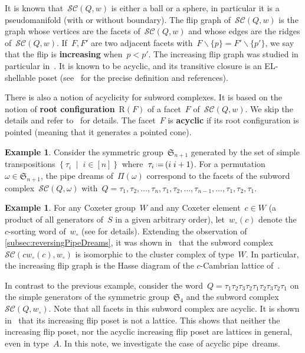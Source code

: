 \documentclass{amsart}
\theoremstyle{definition}
\newtheorem{example}[theorem]{Example}
\newcommand{\set}[2]{\left\{ #1 \;\middle|\; #2 \right\}} %
\newcommand{\ssm}{\smallsetminus} %
\newcommand{\eqdef}{\mbox{\,\raisebox{0.2ex}{\scriptsize\ensuremath{\mathrm:}}\ensuremath{=}\,}} %
\newcommand{\defn}[1]{\textbf{\textsf{\color{PineGreen} #1}}} %
\newcommand{\fS}{\mathfrak{S}} %
\newcommand{\pipeDreams}{\Pi} %
\newcommand{\wo}{w_\circ} %
\newcommand{\subwordComplex}{\mathcal{SC}} %
\newcommand{\Roots}{\mathrm{R}} %
\begin{document}
It is known that~$\subwordComplex(Q,w)$ is either a ball or a sphere, in particular it is a pseudomanifold (with or without boundary).
The flip graph of~$\subwordComplex(Q,w)$ is the graph whose vertices are the facets of~$\subwordComplex(Q,w)$ and whose edges are the ridges of~$\subwordComplex(Q,w)$.
If~$F,F'$ are two adjacent facets with~$F \ssm \{p\} = F' \ssm \{p'\}$, we say that the flip is \defn{increasing} when~$p < p'$.
The increasing flip graph was studied in particular in~\cite{PilaudStump-ELlabelings}.
It is known to be acyclic, and its transitive closure is an EL-shellable poset (see~\cite{PilaudStump-ELlabelings} for the precise definition and references).

There is also a notion of acyclicity for subword complexes.
It is based on the notion of \defn{root configuration}~$\Roots(F)$ of a facet~$F$ of~$\subwordComplex(Q,w)$.
We skip the details and refer to~\cite{CeballosLabbeStump, PilaudStump-brickPolytope} for details.
The facet~$F$ is \defn{acyclic} if its root configuration is pointed (meaning that it generates a pointed cone).

\begin{example}
Consider the symmetric group~$\fS_{n+1}$ generated by the set of simple transpositions $\set{\tau_i}{i \in [n]}$ where~$\tau_i \eqdef (i \; i+1)$.
For a permutation~$\omega \in \fS_{n+1}$, the pipe dreams of~$\pipeDreams(\omega)$ correspond to the facets of the subword complex~$\subwordComplex(Q,\omega)$ with~$Q = \tau_1, \tau_2, \dots, \tau_n, \tau_1, \tau_2, \dots, \tau_{n-1}, \dots, \tau_1, \tau_2, \tau_1$.
\end{example}

\begin{example}
For any Coxeter group~$W$ and any Coxeter element~$c \in W$ (a product of all generators of~$S$ in a given arbitrary order), let~$\wo(c)$ denote the $c$-sorting word of~$\wo$ (see \cite{Reading-CambrianLattices} for details).
Extending the observation of \cref{subsec:reversingPipeDreams}, it was shown in~\cite{CeballosLabbeStump} that the subword complex~$\subwordComplex(c\wo(c), \wo)$ is isomorphic to the cluster complex of type~$W$.
In particular, the increasing flip graph is the Hasse diagram of the $c$-Cambrian lattice of~\cite{Reading-CambrianLattices}.
\end{example}

In contrast to the previous example, consider the word~$Q = \tau_1 \tau_2 \tau_3 \tau_2 \tau_1 \tau_2 \tau_3 \tau_2 \tau_1$ on the simple generators of the symmetric group~$\fS_4$ and the subword complex~$\subwordComplex(Q,\wo)$.
Note that all facets in this subword complex are acyclic.
It is shown in~\cite[Rem.~5.12]{PilaudStump-brickPolytope} that its increasing flip poset is not a lattice.
This shows that neither the increasing flip poset, nor the acyclic increasing flip poset are lattices in general, even in type~$A$.
In this note, we investigate the case of acyclic pipe~dreams.
\end{document}
